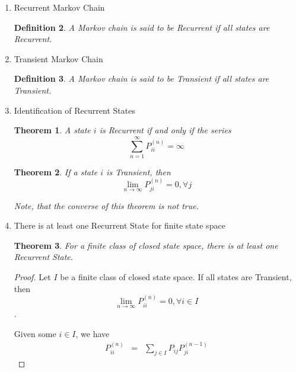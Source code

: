 \documentclass{article}
\newtheorem{definition}{Definition}[section]
\newtheorem{theorem}{Theorem}[section]
\begin{document}
\begin{enumerate}
\begin{definition}
          it is not Recurrent.
        \end{definition}
  \item Recurrent Markov Chain
        \begin{definition}
          A Markov chain is said to be Recurrent if all states are Recurrent.
        \end{definition}
  \item Transient Markov Chain
        \begin{definition}
          A Markov chain is said to be Transient if all states are Transient.
        \end{definition}
  \item Identification of Recurrent States
        \begin{theorem}
          A state $i$ is Recurrent if and only if
          the series
          \begin{equation}
            \sum_{n=1}^{\infty} P^{(n)}_{ii} = \infty
          \end{equation}
        \end{theorem}
        \begin{theorem}
          If a state $i$ is Transient, then
          \begin{equation}
            \lim_{n \to \infty} P^{(n)}_{ji} = 0, \forall j
          \end{equation}

          Note, that the converse of this theorem is not true.
        \end{theorem}
  \item There is at least one Recurrent State for finite state space
        \begin{theorem}
          For a finite class of closed state space, there is at least one Recurrent State.
        \end{theorem}
        \begin{proof}
          Let $I$ be a finite class of closed state space.
          If all states are Transient, then
          \begin{equation}
            \lim_{n \to \infty} P^{(n)}_{ii} = 0, \forall i \in I
          \end{equation}.

          Given some $i \in I$, we have
          \begin{eqnarray}
            P_{ii}^{(n)} &=& \sum_{j \in I} P_{ij} P_{ji}^{(n-1)}
            \label{eqn:proof:atLeastOneRecurrentStateForFiniteStateSpace:Sum}
          \end{eqnarray}


\end{proof}
\end{enumerate}
\end{document}
